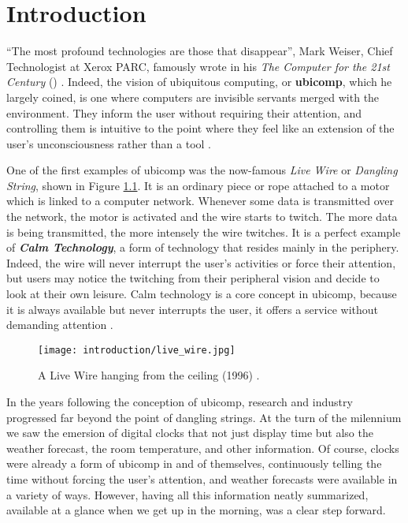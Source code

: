 \chapter{Introduction} \label{chap:intro}
``The most profound technologies are those that disappear'', Mark Weiser, Chief Technologist at Xerox PARC, famously wrote in his \textit{The Computer for the 21st Century} (\citeyear{weiser1991computer}) \cite{weiser1991computer}. Indeed, the vision of ubiquitous computing, or \mbox{\textbf{ubicomp}}, which he largely coined, is one where computers are invisible servants merged with the environment. They inform the user without requiring their attention, and controlling them is intuitive to the point where they feel like an extension of the user's unconsciousness rather than a tool \cite{weiser1997coming}.

One of the first examples of ubicomp was the now-famous \textit{Live Wire} or \textit{Dangling String}, shown in Figure \ref{fig:live_wire}. It is an ordinary piece or rope attached to a motor which is linked to a computer network. Whenever some data is transmitted over the network, the motor is activated and the wire starts to twitch. The more data is being transmitted, the more intensely the wire twitches. It is a perfect example of \textit{\textbf{Calm Technology}}, a form of technology that resides mainly in the periphery. Indeed, the wire will never interrupt the user's activities or force their attention, but users may notice the twitching from their peripheral vision and decide to look at their own leisure. Calm technology is a core concept in ubicomp, because it is always available but never interrupts the user, it offers a service without demanding attention \cite{weiser1996designing}.

\begin{figure}
    \centering
    \texttt{[image: introduction/live\_wire.jpg]}
    \caption{A Live Wire hanging from the ceiling (1996) \cite{weiser1996designing}.}
    \label{fig:live_wire}
\end{figure}

In the years following the conception of ubicomp, research and industry progressed far beyond the point of dangling strings. At the turn of the milennium we saw the emersion of digital clocks that not just display time but also the weather forecast, the room temperature, and other information. Of course, clocks were already a form of ubicomp in and of themselves, continuously telling the time without forcing the user's attention, and weather forecasts were available in a variety of ways. However, having all this information neatly summarized, available at a glance when we get up in the morning, was a clear step forward.

